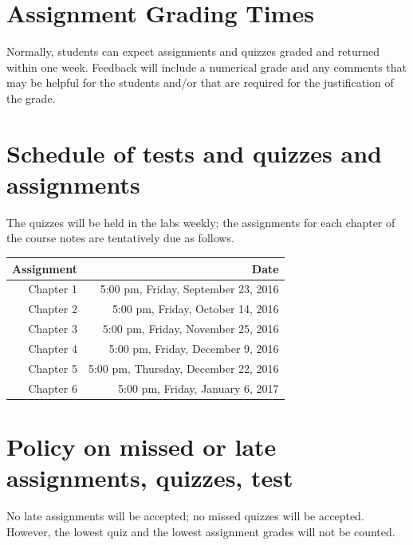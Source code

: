 \documentclass[12pt]{article}
\begin{document}
\section{Assignment Grading Times}

Normally, students can expect assignments and quizzes graded and returned within one week. Feedback will include a numerical grade and any comments that may be helpful for the students and/or that are required for the justification of the grade.

\section{Schedule of tests and quizzes and assignments}

The quizzes will be held in the labs weekly; the assignments for each chapter of the course notes are tentatively due as follows.

\begin{center}
\begin{tabular}[t]{rr}
\toprule
\textbf{Assignment} & \textbf{Date}\\
\midrule
Chapter 1 & 5:00 pm, Friday, September 23, 2016\\
Chapter 2 & 5:00 pm, Friday, October 14, 2016\\
Chapter 3 & 5:00 pm, Friday, November 25, 2016\\
Chapter 4 & 5:00 pm, Friday, December 9, 2016\\
Chapter 5 & 5:00 pm, Thursday, December 22, 2016\\
Chapter 6 & 5:00 pm, Friday, January 6, 2017\\
\bottomrule
\end{tabular}
\end{center}

\section{Policy on missed or late assignments, quizzes, test}

No late assignments will be accepted; no missed quizzes will be accepted. However, the lowest quiz and the lowest assignment grades will not be counted.
\end{document}
